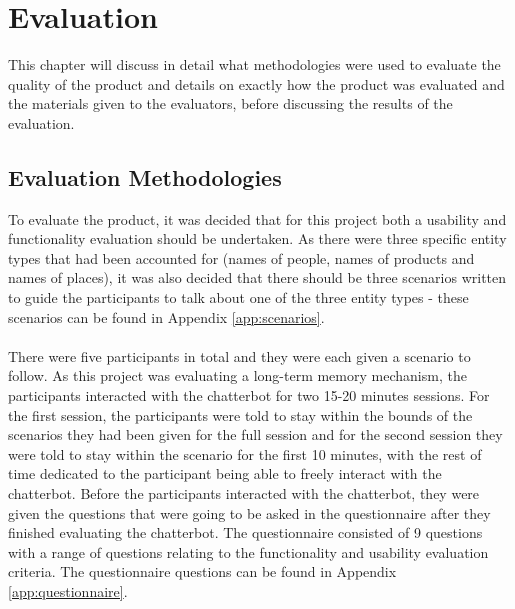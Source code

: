 %
%
\chapter{Evaluation}
This chapter will discuss in detail what methodologies were used to evaluate the quality of the product and details on exactly how the product was evaluated and the materials given to the evaluators, before discussing the results of the evaluation.
\section{Evaluation Methodologies}
To evaluate the product, it was decided that for this project both a usability and functionality evaluation should be undertaken. As there were three specific entity types that had been accounted for (names of people, names of products and names of places), it was also decided that there should be three scenarios written to guide the participants to talk about one of the three entity types - these scenarios can be found in Appendix \ref{app:scenarios}. \\\\
There were five participants in total and they were each given a scenario to follow. As this project was evaluating a long-term memory mechanism, the participants interacted with the chatterbot for two 15-20 minutes sessions. For the first session, the participants were told to stay within the bounds of the scenarios they had been given for the full session and for the second session they were told to stay within the scenario for the first 10 minutes, with the rest of time dedicated to the participant being able to freely interact with the chatterbot. Before the participants interacted with the chatterbot, they were given the questions that were going to be asked in the questionnaire after they finished evaluating the chatterbot. The questionnaire consisted of 9 questions with a range of questions relating to the functionality and usability evaluation criteria. The questionnaire questions can be found in Appendix \ref{app:questionnaire}.
